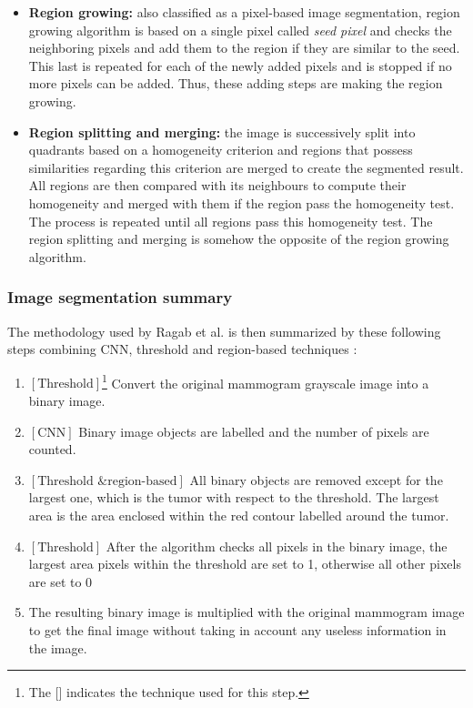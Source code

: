 \documentclass[11pt, openany]{report}
\theoremstyle{plain}
\theoremstyle{definition}
\theoremstyle{remark}
\begin{document}
\begin{itemize}
\item \textbf{Region growing:} also classified as a pixel-based image segmentation, region growing algorithm is based on a single pixel called \textit{seed pixel} and checks the neighboring pixels and add them to the region if they are similar to the seed. This last is repeated for each of the newly added pixels and is stopped if no more pixels can be added. Thus, these adding steps are making the region growing. 

\item \textbf{Region splitting and merging:} the image is successively split into quadrants based on a homogeneity criterion and regions that possess similarities regarding this criterion are merged to create the segmented result. All regions are then compared with its neighbours to compute their homogeneity and merged with them if the region pass the homogeneity test. The process is repeated until all regions pass this homogeneity test. The region splitting and merging is somehow the opposite of the region growing algorithm. 
\end{itemize} 

\subsubsection{Image segmentation summary}
The methodology used by Ragab et al. is then summarized by these following steps combining CNN, threshold and region-based techniques \cite{breast-cancer}: 
\begin{enumerate}
\item $\left[\text{Threshold}\right]$\footnote{The [] indicates the technique used for this step.} Convert the original mammogram grayscale image into a binary image. 
\item $\left[\text{CNN}\right]$ Binary image objects are labelled and the number of pixels are counted. 
\item $\left[\text{Threshold \& region-based}\right]$ All binary objects are removed except for the largest one, which is the tumor with respect to the threshold. The largest area is the area enclosed within the red contour labelled around the tumor. 
\item $\left[\text{Threshold}\right]$ After the algorithm checks all pixels in the binary image, the largest area pixels within the threshold are set to 1, otherwise all other pixels are set to 0
\item The resulting binary image is multiplied with the original mammogram image to get
the final image without taking in account any useless information in the image.
\end{enumerate}
\end{document}
